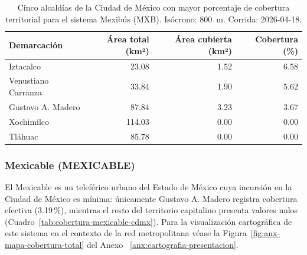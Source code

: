 \begin{table}[H]
    \centering
    \caption[Alcaldías con mayor cobertura de Mexibús (CDMX)]{
    Cinco alcaldías de la Ciudad de México con mayor porcentaje de cobertura
    territorial para el sistema Mexibús (MXB). Isócrono: 800~m.
    Corrida: 2026-04-18.}
    \label{tab:cobertura-mxb-cdmx}
    \begin{tabular}{|l|r|r|r|}
        \hline
        \textbf{Demarcación} & \textbf{Área total (km²)} & \textbf{Área cubierta (km²)} & \textbf{Cobertura (\%)} \\
        \hline
        Iztacalco           &  23.08 & 1.52 & 6.58 \\
        Venustiano Carranza &  33.84 & 1.90 & 5.62 \\
        Gustavo A. Madero   &  87.84 & 3.23 & 3.67 \\
        Xochimilco          & 114.03 & 0.00 & 0.00 \\
        Tláhuac             &  85.78 & 0.00 & 0.00 \\
        \hline
    \end{tabular}
\end{table}

\subsubsection{Mexicable (MEXICABLE)}
\label{subsubsec:cobertura-mexicable}

El Mexicable es un teleférico urbano del Estado de México cuya incursión en la
Ciudad de México es mínima: únicamente Gustavo A. Madero registra cobertura
efectiva (3.19\,\%), mientras el resto del territorio capitalino presenta
valores nulos (Cuadro~\ref{tab:cobertura-mexicable-cdmx}). Para la visualización
cartográfica de este sistema en el contexto de la red metropolitana véase la
Figura~\ref{fig:anx-mapa-cobertura-total} del Anexo~
\ref{anx:cartografia-presentacion}.

